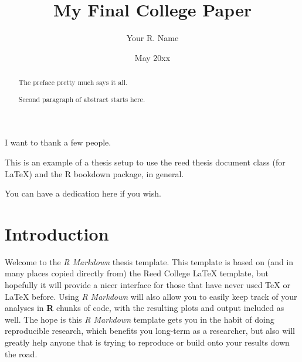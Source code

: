 \documentclass[12pt,twoside]{reedthesis}
\title{My Final College Paper}
\author{Your R. Name}
\date{May 20xx}
\begin{document}
  \maketitle

\frontmatter %
\pagestyle{empty} %
  \begin{acknowledgements}
    I want to thank a few people.
  \end{acknowledgements}
  \begin{preface}
    This is an example of a thesis setup to use the reed thesis document class
    (for LaTeX) and the R bookdown package, in general.
  \end{preface}
  \hypersetup{linkcolor=black}
  \setcounter{tocdepth}{2}
  \tableofcontents

  \listoftables

  \listoffigures
  \begin{abstract}
    The preface pretty much says it all.

    \par

    Second paragraph of abstract starts here.
  \end{abstract}
  \begin{dedication}
    You can have a dedication here if you wish.
  \end{dedication}
\mainmatter %
\pagestyle{fancyplain} %

\chapter*{Introduction}\label{introduction}

Welcome to the \emph{R Markdown} thesis template. This template is based on (and in many places copied directly from) the Reed College LaTeX template, but hopefully it will provide a nicer interface for those that have never used TeX or LaTeX before. Using \emph{R Markdown} will also allow you to easily keep track of your analyses in \textbf{R} chunks of code, with the resulting plots and output included as well. The hope is this \emph{R Markdown} template gets you in the habit of doing reproducible research, which benefits you long-term as a researcher, but also will greatly help anyone that is trying to reproduce or build onto your results down the road.
\end{document}

